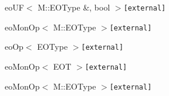 \begin{CompactList}
\begin{CompactList}
\begin{CompactList}
\item {}
\end{CompactList}
\item eoUF$<$ M::EOType \&, bool $>${\tt  [external]}\begin{CompactList}
\item eoMonOp$<$ M::EOType $>${\tt  [external]}\begin{CompactList}
\item {}
\begin{CompactList}
\item {}
\item {}
\item {}
\end{CompactList}
\end{CompactList}
\end{CompactList}
\end{CompactList}
\item eoOp$<$ EOType $>${\tt  [external]}\begin{CompactList}
\item eoMonOp$<$ EOT $>${\tt  [external]}\item eoMonOp$<$ M::EOType $>${\tt  [external]}\end{CompactList}
\end{CompactList}
